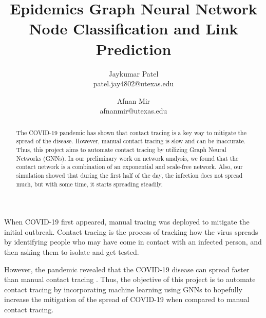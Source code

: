 \documentclass[times, 10pt,twocolumn]{article}
\begin{document}
\title{Epidemics Graph Neural Network Node Classification and Link Prediction}

\author{Jaykumar Patel\\
patel.jay4802@utexas.edu\\
\and
Afnan Mir\\
afnanmir@utexas.edu\\
}

\maketitle
\thispagestyle{empty}

\begin{abstract}
The COVID-19 pandemic has shown that contact tracing is a key way to mitigate the spread of the disease. However, manual contact tracing is slow and can be inaccurate. Thus, this project aims to automate contact tracing by utilizing Graph Neural Networks (GNNs). In our preliminary work on network analysis, we found that the contact network is a combination of an exponential and scale-free network. Also, our simulation showed that during the first half of the day, the infection does not spread much, but with some time, it starts spreading steadily. 
\end{abstract}



When COVID-19 first appeared, manual tracing was deployed to mitigate the initial outbreak. Contact tracing is the process of tracking how the virus spreads by identifying people who may have come in contact with an infected person, and then asking them to isolate and get tested.

However, the pandemic revealed that the COVID-19 disease can spread faster than manual contact tracing \cite{flaxman2020estimating}. Thus, the objective of this project is to automate contact tracing by incorporating machine learning using GNNs to hopefully increase the mitigation of the spread of COVID-19 when compared to manual contact tracing.

\end{document}
